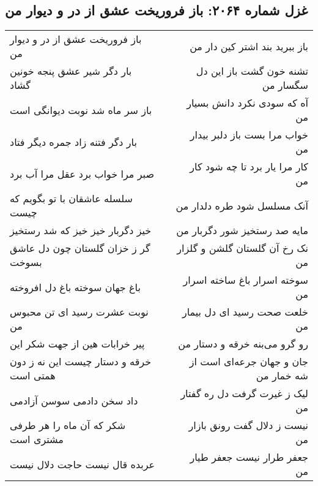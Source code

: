 \begin{center}
\section*{غزل شماره ۲۰۶۴: باز فروریخت عشق از در و دیوار من}
\label{sec:2064}
\begin{longtable}{l p{0.5cm} r}
باز فروریخت عشق از در و دیوار من
&&
باز ببرید بند اشتر کین دار من
\\
بار دگر شیر عشق پنجه خونین گشاد
&&
تشنه خون گشت باز این دل سگسار من
\\
باز سر ماه شد نوبت دیوانگی است
&&
آه که سودی نکرد دانش بسیار من
\\
بار دگر فتنه زاد جمره دیگر فتاد
&&
خواب مرا بست باز دلبر بیدار من
\\
صبر مرا خواب برد عقل مرا آب برد
&&
کار مرا یار برد تا چه شود کار من
\\
سلسله عاشقان با تو بگویم که چیست
&&
آنک مسلسل شود طره دلدار من
\\
خیز دگربار خیز خیز که شد رستخیز
&&
مایه صد رستخیز شور دگربار من
\\
گر ز خزان گلستان چون دل عاشق بسوخت
&&
نک رخ آن گلستان گلشن و گلزار من
\\
باغ جهان سوخته باغ دل افروخته
&&
سوخته اسرار باغ ساخته اسرار من
\\
نوبت عشرت رسید ای تن محبوس من
&&
خلعت صحت رسید ای دل بیمار من
\\
پیر خرابات هین از جهت شکر این
&&
رو گرو می‌بنه خرقه و دستار من
\\
خرقه و دستار چیست این نه ز دون همتی است
&&
جان و جهان جرعه‌ای است از شه خمار من
\\
داد سخن دادمی سوسن آزادمی
&&
لیک ز غیرت گرفت دل ره گفتار من
\\
شکر که آن ماه را هر طرفی مشتری است
&&
نیست ز دلال گفت رونق بازار من
\\
عربده قال نیست حاجت دلال نیست
&&
جعفر طرار نیست جعفر طیار من
\\
\end{longtable}
\end{center}
